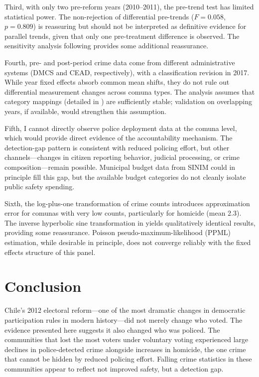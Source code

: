 \documentclass[12pt]{article}
\begin{document}
Third, with only two pre-reform years (2010--2011), the pre-trend test has limited statistical power. The non-rejection of differential pre-trends ($F = 0.058$, $p = 0.809$) is reassuring but should not be interpreted as definitive evidence for parallel trends, given that only one pre-treatment difference is observed. The sensitivity analysis following \citet{Rambachan2023} provides some additional reassurance.

Fourth, pre- and post-period crime data come from different administrative systems (DMCS and CEAD, respectively), with a classification revision in 2017. While year fixed effects absorb common mean shifts, they do not rule out differential measurement changes across comuna types. The analysis assumes that category mappings (detailed in ) are sufficiently stable; validation on overlapping years, if available, would strengthen this assumption.

Fifth, I cannot directly observe police deployment data at the comuna level, which would provide direct evidence of the accountability mechanism. The detection-gap pattern is consistent with reduced policing effort, but other channels---changes in citizen reporting behavior, judicial processing, or crime composition---remain possible. Municipal budget data from SINIM could in principle fill this gap, but the available budget categories do not cleanly isolate public safety spending.

Sixth, the log-plus-one transformation of crime counts introduces approximation error for comunas with very low counts, particularly for homicide (mean 2.3). The inverse hyperbolic sine transformation in  yields qualitatively identical results, providing some reassurance. Poisson pseudo-maximum-likelihood (PPML) estimation, while desirable in principle, does not converge reliably with the fixed effects structure of this panel.


\section{Conclusion}\label{sec:conclusion}

Chile's 2012 electoral reform---one of the most dramatic changes in democratic participation rules in modern history---did not merely change who voted. The evidence presented here suggests it also changed who was policed. The communities that lost the most voters under voluntary voting experienced large declines in police-detected crime alongside increases in homicide, the one crime that cannot be hidden by reduced policing effort. Falling crime statistics in these communities appear to reflect not improved safety, but a detection gap.
\end{document}
